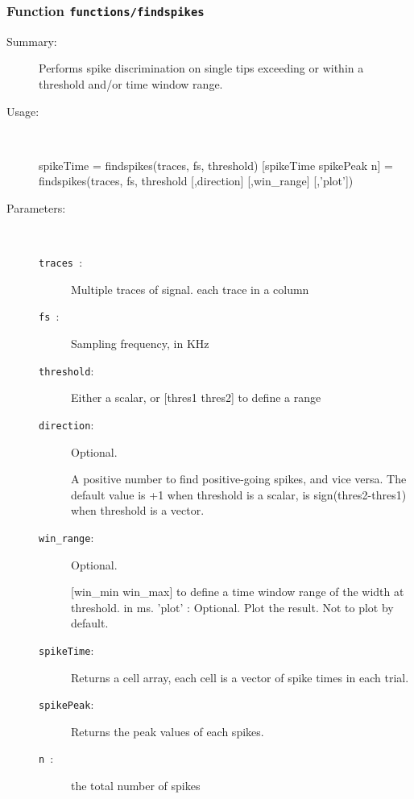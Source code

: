 \subsubsection[Function \texttt{findspikes}]{Function \texttt{functions/findspikes}}%
%
\label{ref_functions__findspikes}%
\hypertarget{ref_functions__findspikes}{}%
\begin{description}
\item[Summary:]Performs spike discrimination on single tips exceeding or within a threshold and/or time window range.
%
\item[Usage:]~%
\begin{lyxcode}%
spikeTime = findspikes(traces, fs, threshold)
  [spikeTime spikePeak n] = findspikes(traces, fs, threshold [,direction] [,win\_range] [,'plot'])
%
\end{lyxcode}%
%
%
\item[Parameters:]~
\begin{description}%
\item[\texttt{traces   }:]
 Multiple traces of signal. each trace in a column
\item[\texttt{fs       }:]
 Sampling frequency, in KHz
\item[\texttt{threshold}:]
 Either a scalar, or [thres1 thres2] to define a range
\item[\texttt{direction}:]
 Optional. 

A positive number to find positive-going spikes, and vice versa. 
The default value is +1 when threshold is a scalar,
is sign(thres2-thres1) when threshold is a vector.\item[\texttt{win\_range}:]
 Optional. 

[win\_min win\_max] to define a time window range of the width at threshold. in ms.
'plot'   : Optional. Plot the result. Not to plot by default.\item[\texttt{spikeTime}:]
 Returns a cell array, each cell is a vector of spike times in each trial.
\item[\texttt{spikePeak}:]
 Returns the peak values of each spikes.
\item[\texttt{n        }:]
 the total number of spikes
\end{description}%
%
%
%
%
%
\end{description}
\methodline%
